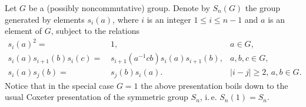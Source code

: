 \documentclass[oneside, 10pt]{amsart}
\makeatletter
\theoremstyle{plain}
\numberwithin{equation}{section}
\numberwithin{lemma}{section}
\theoremstyle{remark}
\theoremstyle{definition}
\newcommand{\pullbackcorner}[1][dr]{\save*!/#1-1.2pc/#1:(-1,1)@^{|-}\restore}
\makeatother
\begin{document}
\begin{comment}
Denote by $D_n(G)$ the subgroup of $G^n$ consisting of vectors
 $(g_1,\ldots, g_n)$ for which the product $g_1\cdot \ldots \cdot g_n$ lies in the derived subgroup $[G, G]$.
Recall from Rehmann's paper~\cite{Reh78} that the universal {\it extension of type $\mathfrak{H}_n$} (denoted $H_n(G)$) 
 is, by definition, a certain (central) extension of $D_n(G)$ explicitly presented by generators and relations 
 (see section~\ref{sec:Hnextensions} below).
The extension $H_n(G)$ and its ''antisymmetrization`` $H^\wedge_n(G)$ can be characterised by the property that 
 they fit into the following pullback squares:
\[ \xymatrix{ G \mathbin{\widetilde{\wedge}} G \pullbackcorner \ar@{^{(}->}[d] \ar@{->>}[r] & [G, G] \ar@{^{(}->}[d]^{\iota_1} \\ H_n(G) \ar@{->>}[r] & D_n(G)} \qquad
   \xymatrix{ G \wedge G \pullbackcorner \ar@{^{(}->}[d] \ar@{->>}[r] & [G, G] \ar@{^{(}->}[d]^{\iota_1} \\ H^\wedge_n(G) \ar@{->>}[r] & D_n(G)} \]
Here $G \wedge G$ denotes the nonabelian exterior square of $G$ and  
 $G \mathbin{\widetilde{\wedge}} G$ is the modern notation for the Dennis group $(G, G)$ defined in~\cite{De76} (also denoted $U_G$ by Rehmann in \cite{Reh78}).
The map $\iota_1$ in the above diagrams is defined by $\iota_1(g) = (g, 1,\ldots, 1)$.
\end{comment}
Let $G$ be a (possibly noncommutative) group. 
Denote by $S_n(G)$ the group generated by elements $s_i(a)$, where $i$ is an integer $1\leq i\leq n-1$ and $a$ is an element of $G$, subject to the relations
\begin{align}
s_i(a)^2                 = &\, 1,                                     & a \in G,                  \label{Cox1} \\
s_i(a) s_{i+1}(b) s_i(c) = &\, s_{i+1}(a^{-1}cb) s_i(a) s_{i+1}(b),   & a, b, c \in G,            \label{Cox2}  \\
s_i(a) s_j(b)            = &\, s_j(b) s_i(a).                         & |i-j|\geq 2,\, a, b\in G. \label{Cox3} 
\end{align}
Notice that in the special case $G=1$ the above presentation boils down to the usual Coxeter presentation of the symmetric group $S_n$,
 i.\,e. $S_n(1) = S_n$.
 
\end{document}
